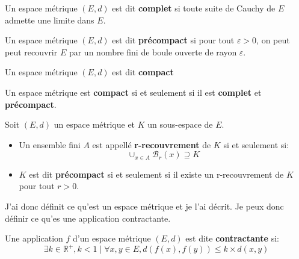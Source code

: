 \documentclass[a4paper, 12pt]{report}
\begin{document}
			\begin{definition}
				Un espace métrique $(E,d)$ est dit \textbf{complet} si toute suite de Cauchy de $E$ admette une limite dans $E$.
				\label{espMetriqueDef}
			\end{definition}
			
			\begin{definition}
				Un espace métrique $(E,d)$ est dit \textbf{précompact} si pour tout $\varepsilon >0$, on peut peut recouvrir $E$ par un nombre fini de boule ouverte de rayon $\varepsilon$.
			\end{definition}
			
			\begin{definition}
				Un espace métrique $(E,d)$ est dit \textbf{compact} 
			\end{definition}
			
			\begin{prop}
				Un espace métrique est \textbf{compact} si et seulement si il est \textbf{complet} et \textbf{précompact}.
			\end{prop}
			
			\begin{definition}
				Soit $(E,d)$ un espace métrique et $K$ un sous-espace de $E$.
				\begin{itemize}
					\item Un ensemble fini $A$ est appellé \textbf{r-recouvrement} de $K$ si et seulement si:
					\begin{equation*}
						\cup_{x\in A} \mathcal{B}_r(x)\supseteq K
					\end{equation*}
					\item $K$ est dit \textbf{précompact} si et seulement si il existe un r-recouvrement de $K$ pour tout $r>0$.

				\end{itemize}

			\end{definition}


			J'ai donc définit ce qu'est un espace métrique et je l'ai décrit. Je peux donc définir ce qu'es une application contractante.
			\begin{definition}
				Une application $f$ d'un espace métrique $(E,d)$ est dite \textbf{contractante} si:
				\begin{equation}
					\exists k\in\mathds{R}^+, k<1 \mid \forall x,y\in E, d(f(x),f(y))\leqslant k\times d(x,y)
					\label{Pcontractante}
				\end{equation}
			\end{definition}
			
\end{document}
